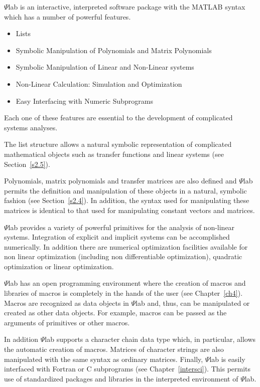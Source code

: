 $\Psi$lab is an interactive, interpreted software package with 
the MATLAB syntax which has a number of powerful features.  
%
\begin{itemize}
	\item Lists
	\item Symbolic Manipulation of Polynomials and Matrix Polynomials
        \item Symbolic Manipulation of Linear and Non-Linear systems
	\item Non-Linear Calculation: Simulation and Optimization
	\item Easy Interfacing with Numeric Subprograms
\end{itemize}
%
Each one of these features are essential to the development 
of complicated systems analyses.

 The list structure allows a natural symbolic representation of complicated
mathematical objects such as transfer functions and linear systems
(see Section~\ref{s2.5}).

	Polynomials, matrix polynomials and transfer matrices 
are also defined and 
$\Psi$lab permits the definition and manipulation of these objects in a
natural, symbolic fashion (see Section~\ref{s2.4}).  In addition,
the syntax used for manipulating these matrices
is identical to that used for manipulating constant vectors and matrices.

	$\Psi$lab provides a variety of powerful primitives for
the analysis of non-linear systems.  
Integration of explicit and implicit systems can be accomplished 
numerically.  In addition there are numerical optimization 
facilities available for non linear optimization (including
non differentiable optimization), quadratic optimization or 
linear optimization.

	$\Psi$lab has an open programming environment where the
creation of macros and libraries of macros is completely in the
hands of the user (see Chapter~\ref{ch4}).    
Macros are recognized as data objects in $\Psi$lab and, thus, can be 
manipulated or created as other data objects.  For example, macros
can be passed as the arguments of primitives or other macros.

In addition $\Psi$lab supports a character chain data type 
which, in particular, allows the automatic creation of macros.
Matrices of character strings are also manipulated with the same
syntax as ordinary matrices.
	Finally, $\Psi$lab is easily interfaced with Fortran or C 
subprograms (see Chapter~\ref{intersci}).  This permits use of standardized 
packages and libraries in the interpreted environment of $\Psi$lab.

